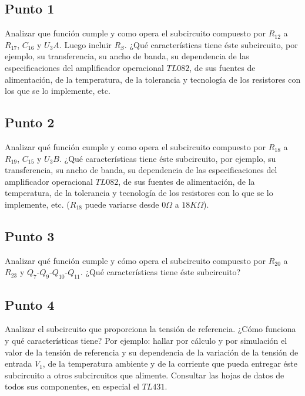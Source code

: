 
\subsection{Punto 1}

Analizar que función cumple y como opera el subcircuito compuesto por $R_{12}$ a $R_{17}$, $C_{16}$ y $U_{3}A$. Luego incluir $R_{S}$. ¿Qué características tiene éste subcircuito, por ejemplo, su transferencia, su ancho de banda, su dependencia de las especificaciones del amplificador operacional $TL082$, de sus fuentes de alimentación, de la temperatura, de la tolerancia y tecnología de los resistores con los que se lo implemente, etc.


\subsection{Punto 2}

 Analizar qué función cumple y como opera el subcircuito compuesto por $R_{18}$ a $R_{19}$, $C_{15}$ y $U_{3}B$. ¿Qué características tiene éste subcircuito, por ejemplo, su transferencia, su ancho de banda, su dependencia de las especificaciones del amplificador operacional $TL082$, de sus fuentes de alimentación, de la temperatura, de la tolerancia y tecnología de los resistores con lo que se lo implemente, etc. ($R_{18}$ puede variarse desde $0 \Omega$ a $18 K\Omega$).


\subsection{Punto 3}

Analizar qué función cumple y cómo opera el subcircuito compuesto por $R_{20}$ a $R_{23}$ y $Q_{7}$-$Q_{9}$-$Q_{10}$-$Q_{11}$. ¿Qué características tiene éste subcircuito?


\subsection{Punto 4}

Analizar el subcircuito que proporciona la tensión de referencia. ¿Cómo funciona y qué características tiene? Por ejemplo: hallar por cálculo y por simulación el valor de la tensión de referencia y su dependencia de la variación de la tensión de entrada $V_{1}$, de la temperatura ambiente y de la corriente que pueda entregar éste subcircuito a otros subcircuitos que alimente. Consultar las hojas de datos de todos sus componentes, en especial el $TL431$.


